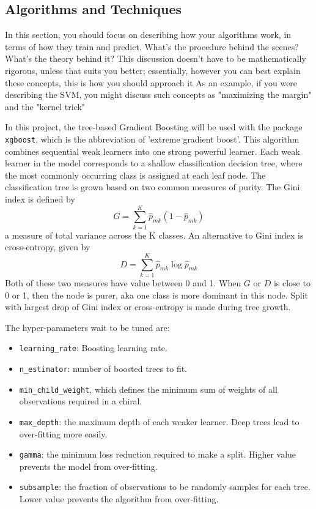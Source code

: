 \documentclass[12pt]{article}
\begin{document}
\subsection{Algorithms and Techniques}


In this section, you should focus on describing how your algorithms work, in terms of how they train and predict. What's the procedure behind the scenes? What's the theory behind it? This discussion doesn't have to be mathematically rigorous, unless that suits you better; essentially, however you can best explain these concepts, this is how you should approach it
As an example, if you were describing the SVM, you might discuss such concepts as "maximizing the margin" and the "kernel trick"


In this project, the tree-based Gradient Boosting will be used with the package \verb|xgboost|, which is the abbreviation of 'extreme gradient boost'. This algorithm combines sequential weak learners into one strong powerful learner. Each weak learner in the model corresponds to a shallow classification decision tree, where the most commonly occurring class is assigned at each leaf node.
The classification tree is grown based on two common measures of purity. 
The Gini index is defined by 
\begin{equation}
G = \sum_{k=1}^K\hat{p}_{mk}(1-\hat{p}_{mk})
\end{equation}
a measure of total variance across the K classes.
An alternative to Gini index is cross-entropy, given by
\begin{equation}
D = \sum_{k=1}^K\hat{p}_{mk}\log\hat{p}_{mk}
\end{equation}
Both of these two measures have value between 0 and 1. When $G$ or $D$ is close to 0 or 1, then the node is purer, aka one class is more dominant in this node. Split with largest drop of Gini index or cross-entropy is made during tree growth.

The hyper-parameters wait to be tuned are:

\begin{itemize}
\item \verb|learning_rate|: Boosting learning rate.
\item \verb|n_estimator|: number of boosted trees to fit.
\item \verb|min_child_weight|, which defines the minimum sum of weights of all observations required in a chiral.
\item \verb|max_depth|: the maximum depth of each weaker learner. Deep trees lead to over-fitting more easily.
\item \verb|gamma|: the minimum loss reduction required to make a split. Higher value prevents the model from over-fitting.
\item \verb|subsample|: the fraction of observations to be randomly samples for each tree. Lower value prevents the algorithm from over-fitting.
\end{itemize}
\end{document}

